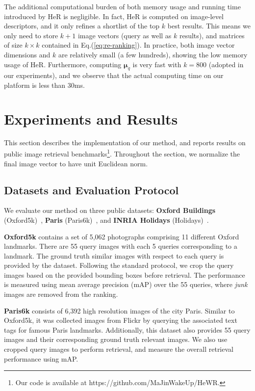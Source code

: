 \documentclass[journal]{IEEEtran}
\begin{document}
The additional computational burden of both memory usage and running time introduced by HeR is negligible. In fact, HeR is computed on image-level descriptors, and it only refines a shortlist of the top $k$ best results.
This means we only need to store $k+1$ image vectors (query as well as $k$ results), and matrices of size $k \times k$ contained in Eq.(\ref{eq:re-ranking}). In practice, both image vector dimensions and $k$ are relatively small (a few hundreds), showing the low memory usage of HeR. Furthermore, computing $\boldsymbol{\mu}_q$ is very fast with $k=800$ (adopted in our experiments), and we observe that the actual computing time on our platform is less than 30ms.

\section{Experiments and Results}\label{sec:experiments}
This section describes the implementation of our method, and reports results on public image retrieval benchmarks\footnote{Our code is available at https://github.com/MaJinWakeUp/HeWR.}.
Throughout the section, we normalize the final image vector to have unit Euclidean norm.

\subsection{Datasets and Evaluation Protocol}
We evaluate our method on three public datasets: \textbf{Oxford Buildings} (Oxford5k)~\cite{philbin2007object}, \textbf{Paris} (Paris6k)~\cite{Philbin08lost}, and \textbf{INRIA Holidays} (Holidays)~\cite{jegou2010improving}.

\vspace{0.01in}
\textbf{Oxford5k} contains a set of 5,062 photographs comprising 11 different Oxford landmarks.
There are 55 query images with each 5 queries corresponding to a landmark.
The ground truth similar images with respect to each query is provided by the dataset.
Following the standard protocol, we crop the query images based on the provided bounding boxes before retrieval.
The performance is measured using mean average precision (mAP) over the 55 queries,
where \emph{junk} images are removed from the ranking.

\vspace{0.01in}
\textbf{Paris6k} consists of 6,392 high resolution images of the city Paris.
Similar to Oxford5k, it was collected images from Flickr by querying the associated
text tags for famous Paris landmarks.
Additionally, this dataset also provides 55 query images and their corresponding ground truth relevant images.
We also use cropped query images to perform retrieval, and measure the overall retrieval performance using mAP.
\end{document}
